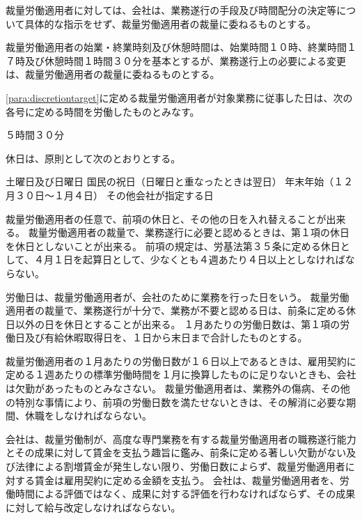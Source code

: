 \documentclass[10pt,a4paper,uplatex]{jsarticle}
\begin{document}
裁量労働適用者に対しては、会社は、業務遂行の手段及び時間配分の決定等について具体的な指示をせず、裁量労働適用者の裁量に委ねるものとする。

裁量労働適用者の始業・終業時刻及び休憩時間は、始業時間１０時、終業時間１７時及び休憩時間１時間３０分を基本とするが、業務遂行上の必要による変更は、裁量労働適用者の裁量に委ねるものとする。

\ref{para:discretiontarget}に定める裁量労働適用者が対象業務に従事した日は、次の各号に定める時間を労働したものとみなす。
\begin{enumerate}
    \itm ５時間３０分
\end{enumerate}

休日は、原則として次のとおりとする。
\begin{enumerate}
    \itm 土曜日及び日曜日
    \itm 国民の祝日（日曜日と重なったときは翌日）
    \itm 年末年始（１２月３０日〜１月４日）
    \itm その他会社が指定する日
\end{enumerate}
\term 裁量労働適用者の任意で、前項の休日と、その他の日を入れ替えることが出来る。
\term 裁量労働適用者の裁量で、業務遂行に必要と認めるときは、第１項の休日を休日としないことが出来る。
\term 前項の規定は、労基法第３５条に定める休日として、４月１日を起算日として、少なくとも４週あたり４日以上としなければならない。


労働日は、裁量労働適用者が、会社のために業務を行った日をいう。
\term 裁量労働適用者の裁量で、業務遂行が十分で、業務が不要と認める日は、前条に定める休日以外の日を休日とすることが出来る。
\term １月あたりの労働日数は、第１項の労働日及び有給休暇取得日を、１日から末日まで合計したものとする。

裁量労働適用者の１月あたりの労働日数が１６日以上であるときは、雇用契約に定める１週あたりの標準労働時間を１月に換算したものに足りないときも、会社は欠勤があったものとみなさない。
\term 裁量労働適用者は、業務外の傷病、その他の特別な事情により、前項の労働日数を満たせないときは、その解消に必要な期間、休職をしなければならない。

会社は、裁量労働制が、高度な専門業務を有する裁量労働適用者の職務遂行能力とその成果に対して賃金を支払う趣旨に鑑み、前条に定める著しい欠勤がない及び法律による割増賃金が発生しない限り、労働日数によらず、裁量労働適用者に対する賃金は雇用契約に定める金額を支払う。
\term 会社は、裁量労働適用者を、労働時間による評価ではなく、成果に対する評価を行わなければならず、その成果に対して給与改定しなければならない。
\end{document}
